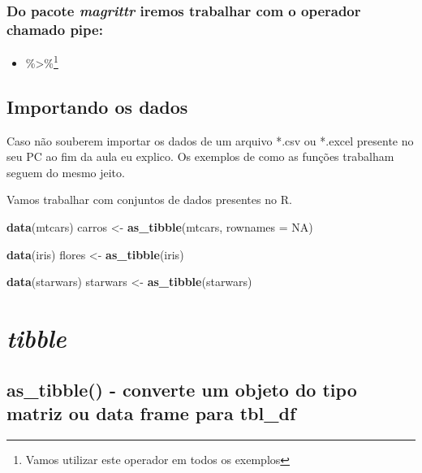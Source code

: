 \documentclass[]{book}
\newenvironment{Shaded}{\begin{snugshade}}{\end{snugshade}}
\newcommand{\DataTypeTok}[1]{\textcolor[rgb]{0.13,0.29,0.53}{#1}}
\newcommand{\KeywordTok}[1]{\textcolor[rgb]{0.13,0.29,0.53}{\textbf{#1}}}
\newcommand{\NormalTok}[1]{#1}
\newcommand{\OtherTok}[1]{\textcolor[rgb]{0.56,0.35,0.01}{#1}}
\newcommand{\StringTok}[1]{\textcolor[rgb]{0.31,0.60,0.02}{#1}}
\providecommand{\tightlist}{%
  \setlength{\itemsep}{0pt}\setlength{\parskip}{0pt}}
\begin{document}
\hypertarget{do-pacote-magrittr-iremos-trabalhar-com-o-operador-chamado-pipe}{%
\subsection{\texorpdfstring{Do pacote \emph{magrittr} iremos trabalhar com o operador chamado \textbf{pipe}:}{Do pacote magrittr iremos trabalhar com o operador chamado pipe:}}\label{do-pacote-magrittr-iremos-trabalhar-com-o-operador-chamado-pipe}}

\begin{itemize}
\tightlist
\item
  \%\textgreater{}\%\footnote{Vamos utilizar este operador em todos os exemplos}
\end{itemize}

\hypertarget{importando-os-dados}{%
\section{Importando os dados}\label{importando-os-dados}}

Caso não souberem importar os dados de um arquivo *.csv ou *.excel presente no seu PC ao fim da aula eu explico. Os exemplos de como as funções trabalham seguem do mesmo jeito.

Vamos trabalhar com conjuntos de dados presentes no R.

\begin{Shaded}
\begin{Highlighting}[]
\KeywordTok{data}\NormalTok{(mtcars)}
\NormalTok{carros <-}\StringTok{ }\KeywordTok{as_tibble}\NormalTok{(mtcars, }\DataTypeTok{rownames =} \OtherTok{NA}\NormalTok{)}

\KeywordTok{data}\NormalTok{(iris)}
\NormalTok{flores <-}\StringTok{ }\KeywordTok{as_tibble}\NormalTok{(iris)}

\KeywordTok{data}\NormalTok{(starwars)}
\NormalTok{starwars <-}\StringTok{ }\KeywordTok{as_tibble}\NormalTok{(starwars)}
\end{Highlighting}
\end{Shaded}

\hypertarget{tibble}{%
\chapter{\texorpdfstring{\emph{tibble}}{tibble}}\label{tibble}}

\hypertarget{as_tibble---converte-um-objeto-do-tipo-matriz-ou-data-frame-para-tbl_df}{%
\section{as\_tibble() - converte um objeto do tipo matriz ou data frame para tbl\_df}\label{as_tibble---converte-um-objeto-do-tipo-matriz-ou-data-frame-para-tbl_df}}
\end{document}

